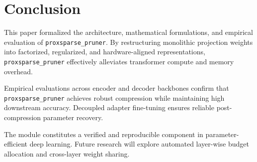 \section{Conclusion}
This paper formalized the architecture, mathematical formulations, and empirical evaluation of \texttt{proxsparse\_pruner}. By restructuring monolithic projection weights into factorized, regularized, and hardware-aligned representations, \texttt{proxsparse\_pruner} effectively alleviates transformer compute and memory overhead.

Empirical evaluations across encoder and decoder backbones confirm that \texttt{proxsparse\_pruner} achieves robust compression while maintaining high downstream accuracy. Decoupled adapter fine-tuning ensures reliable post-compression parameter recovery.

The module constitutes a verified and reproducible component in parameter-efficient deep learning. Future research will explore automated layer-wise budget allocation and cross-layer weight sharing.
